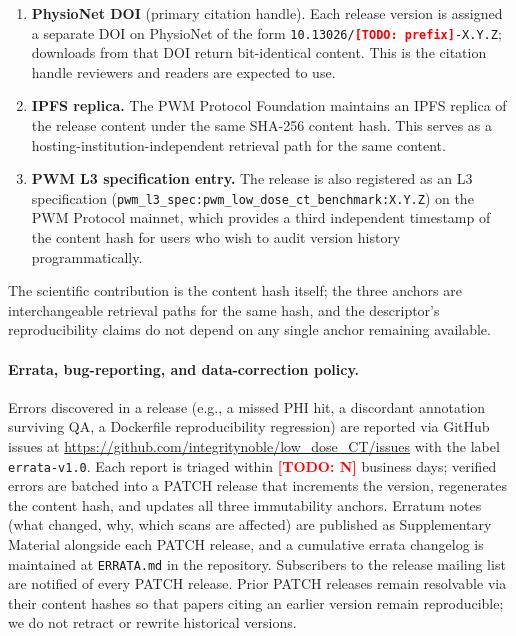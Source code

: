 \documentclass[twoside,11pt]{article}
\newcommand{\todo}[1]{\textcolor{red}{\textbf{[TODO: #1]}}}
\begin{document}
\begin{enumerate}
    \item \textbf{PhysioNet DOI} (primary citation handle). Each release version is assigned a separate DOI on PhysioNet of the form \texttt{10.13026/\todo{prefix}-X.Y.Z}; downloads from that DOI return bit-identical content. This is the citation handle reviewers and readers are expected to use.
    \item \textbf{IPFS replica.} The PWM Protocol Foundation maintains an IPFS replica of the release content under the same SHA-256 content hash. This serves as a hosting-institution-independent retrieval path for the same content.
    \item \textbf{PWM L3 specification entry.} The release is also registered as an L3 specification (\texttt{pwm\_l3\_spec:pwm\_low\_dose\_ct\_benchmark:X.Y.Z}) on the PWM Protocol mainnet, which provides a third independent timestamp of the content hash for users who wish to audit version history programmatically.
\end{enumerate}

The scientific contribution is the content hash itself; the three anchors are interchangeable retrieval paths for the same hash, and the descriptor's reproducibility claims do not depend on any single anchor remaining available.

\paragraph{Errata, bug-reporting, and data-correction policy.} Errors discovered in a release (e.g., a missed PHI hit, a discordant annotation surviving QA, a Dockerfile reproducibility regression) are reported via GitHub issues at \url{https://github.com/integritynoble/low_dose_CT/issues} with the label \texttt{errata-v1.0}. Each report is triaged within \todo{N} business days; verified errors are batched into a PATCH release that increments the version, regenerates the content hash, and updates all three immutability anchors. Erratum notes (what changed, why, which scans are affected) are published as Supplementary Material alongside each PATCH release, and a cumulative errata changelog is maintained at \texttt{ERRATA.md} in the repository. Subscribers to the release mailing list are notified of every PATCH release. Prior PATCH releases remain resolvable via their content hashes so that papers citing an earlier version remain reproducible; we do not retract or rewrite historical versions.
\end{document}
